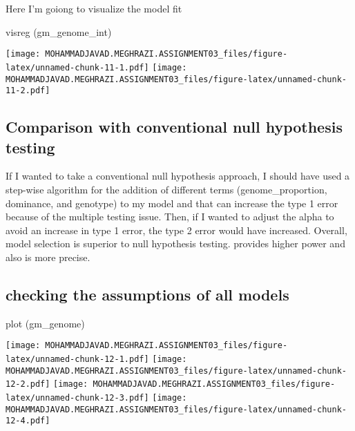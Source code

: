 \documentclass[
]{article}
\newenvironment{Shaded}{\begin{snugshade}}{\end{snugshade}}
\newcommand{\FunctionTok}[1]{\textcolor[rgb]{0.00,0.00,0.00}{#1}}
\newcommand{\NormalTok}[1]{#1}
\begin{document}
Here I'm goiong to visualize the model fit

\begin{Shaded}
\begin{Highlighting}[]
\FunctionTok{visreg}\NormalTok{ (gm\_genome\_int) }
\end{Highlighting}
\end{Shaded}

\texttt{[image: MOHAMMADJAVAD.MEGHRAZI.ASSIGNMENT03\_files/figure-latex/unnamed-chunk-11-1.pdf]}
\texttt{[image: MOHAMMADJAVAD.MEGHRAZI.ASSIGNMENT03\_files/figure-latex/unnamed-chunk-11-2.pdf]}

\hypertarget{comparison-with-conventional-null-hypothesis-testing}{%
\subsection{Comparison with conventional null hypothesis
testing}\label{comparison-with-conventional-null-hypothesis-testing}}

If I wanted to take a conventional null hypothesis approach, I should
have used a step-wise algorithm for the addition of different terms
(genome\_proportion, dominance, and genotype) to my model and that can
increase the type 1 error because of the multiple testing issue. Then,
if I wanted to adjust the alpha to avoid an increase in type 1 error,
the type 2 error would have increased. Overall, model selection is
superior to null hypothesis testing. provides higher power and also is
more precise.

\hypertarget{checking-the-assumptions-of-all-models}{%
\subsection{checking the assumptions of all
models}\label{checking-the-assumptions-of-all-models}}

\begin{Shaded}
\begin{Highlighting}[]
\FunctionTok{plot}\NormalTok{ (gm\_genome)}
\end{Highlighting}
\end{Shaded}

\texttt{[image: MOHAMMADJAVAD.MEGHRAZI.ASSIGNMENT03\_files/figure-latex/unnamed-chunk-12-1.pdf]}
\texttt{[image: MOHAMMADJAVAD.MEGHRAZI.ASSIGNMENT03\_files/figure-latex/unnamed-chunk-12-2.pdf]}
\texttt{[image: MOHAMMADJAVAD.MEGHRAZI.ASSIGNMENT03\_files/figure-latex/unnamed-chunk-12-3.pdf]}
\texttt{[image: MOHAMMADJAVAD.MEGHRAZI.ASSIGNMENT03\_files/figure-latex/unnamed-chunk-12-4.pdf]}
\end{document}
